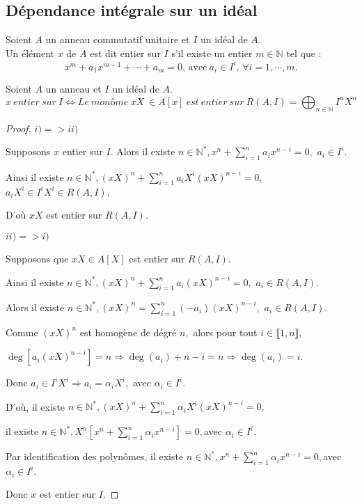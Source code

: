 \subsection{Dépendance intégrale sur un idéal}
\begin{madefinition}
	Soient $A$ un anneau commutatif unitaire et $I$ un idéal de $A$.\\ Un élément $x$ de $A$ est dit entier sur $I$ s'il existe un entier $m \in \mathbb{N}$ tel que : 
	\[ 	x^m + a_1 x^{m-1} + \cdots + a_m = 0\text{, avec} \ a_i \in I^i,\, \forall i=1, \cdots ,m. \]	
\end{madefinition}
\begin{monlemme}
	Soient $A$ un anneau et $I$ un idéal de $A$.
	\[ x \ entier \ sur \ I \Longleftrightarrow Le \ monôme \ xX \ \in A[x] \ est \ entier \ sur \ R(A, I) = \displaystyle \bigoplus_{n \in \mathbb{N}}{I^nX^n} \]
\end{monlemme}
\begin{proof}
	$i)=>ii)$
	
	Supposons $x$ entier sur $I.$ Alors il existe $n\in \mathbb{N}^{\ast },x^{n}+\sum\limits_{i=1}^{n}a_{i}x^{n-i}=0,$ $a_{i}\in I^{i}.$
	
	Ainsi il existe $n\in \mathbb{N}^{\ast },(xX)^{n}+\sum\limits_{i=1}^{n}a_{i}X^{i}(xX)^{n-i}=0,$ $%
	a_{i}X^{i}\in I^{i}X^{i}\in R(A,I).$
	
	D'où  $xX$ est entier sur $R(A,I).$
	
	$ii)=>i)$
	
	Supposons que  $xX\in A[X]$ est entier sur $R(A,I).$
	
	Ainsi il existe $n\in \mathbb{N}^{\ast },(xX)^{n}+\sum\limits_{i=1}^{n}a_{i}(xX)^{n-i}=0,$ $a_{i}\in R(A,I).
	$
	
	Alors il existe $n\in \mathbb{N}^{\ast },(xX)^{n}=\sum\limits_{i=1}^{n}(-a_{i})(xX)^{n-i},$ $a_{i}\in
	R(A,I).$
	
	Comme $(xX)^{n}$ est homogène de dégré $n,$ alors pour tout $%
	i\in \llbracket 1, n \rrbracket,$
	
	$\deg [a_{i}(xX)^{n-i}]=n\Rightarrow \deg (a_{i})+n-i=n\Rightarrow \deg
	(a_{i})=i.$
	
	Donc $a_{i}\in I^{i}X^{i}\Rightarrow a_{i}=\alpha _{i}X^{i},$ avec $\alpha
	_{i}\in I^{i}.$
	
	D'où,  il existe $n\in \mathbb{N}^{\ast },(xX)^{n}+\sum\limits_{i=1}^{n}\alpha _{i}X^{i}(xX)^{n-i}=0,$
	
	il existe $n\in \mathbb{N}^{\ast },X^{n}[x^{n}+\sum\limits_{i=1}^{n}\alpha _{i}x^{n-i}]=0,$avec $\alpha _{i}\in I^{i}.$
	
	Par identification des polynômes, il existe $n\in \mathbb{N}^{\ast },x^{n}+\sum\limits_{i=1}^{n}\alpha _{i}x^{n-i}=0,$avec $\alpha_{i}\in I^{i}.$
	
	Donc $x$ est entier sur $I.$
\end{proof}
